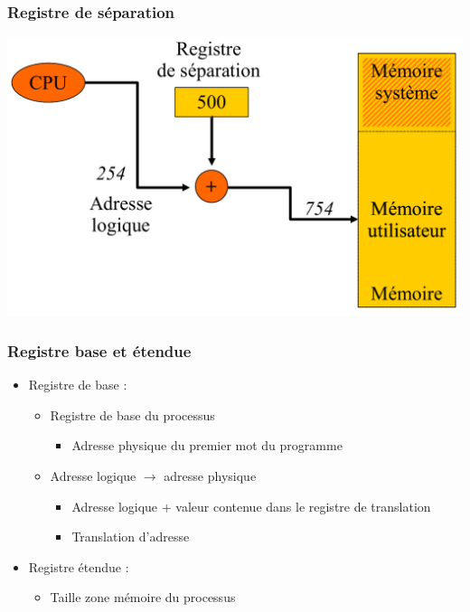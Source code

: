 \begin{frame}
\frametitle{Registre de séparation}
\includegraphics[width=\textwidth]{../illustration/memoire_principale_registre_sep.pdf}
\end{frame}


\begin{frame}
\frametitle{Registre base et étendue}
\begin{itemize}
\item Registre de base :
\begin{itemize}
\item Registre de base du processus
\begin{itemize}
\item Adresse physique du premier mot du programme
\end{itemize}
\item Adresse logique $\rightarrow$ adresse physique
\begin{itemize}
\item Adresse logique + valeur contenue dans le registre de translation
\item Translation d'adresse
\end{itemize}
\end{itemize}
\item Registre étendue :
\begin{itemize}
\item Taille zone mémoire du processus
\end{itemize}
\end{itemize}
\end{frame}


